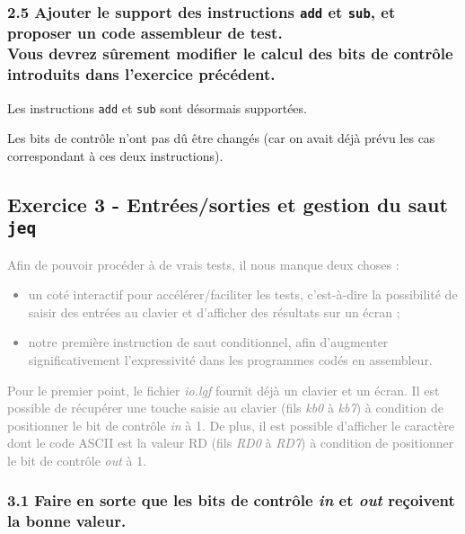 \documentclass[twoside, 12pt, a4paper]{article}
\begin{document}
        \subsubsection*{\textbf{2.5} Ajouter le support des instructions \texttt{add} et \texttt{sub}, et proposer un code assembleur de test. \\
        Vous devrez sûrement modifier le calcul des bits de contrôle introduits dans l'exercice précédent.}

Les instructions \texttt{add} et \texttt{sub} sont désormais supportées.


Les bits de contrôle n'ont pas dû être changés (car on avait déjà prévu les cas correspondant à ces deux instructions).
        
        \clearpage

        \subsection{Exercice 3 - Entrées/sorties et gestion du saut \texttt{jeq}}

\textcolor{gray}{
Afin de pouvoir procéder à de vrais tests, il nous manque deux choses :
\begin{itemize}
    \item un coté interactif pour accélérer/faciliter les tests, c’est-à-dire la possibilité de saisir des
entrées au clavier et d’afficher des résultats sur un écran ;
    \item notre première instruction de saut conditionnel, afin d’augmenter significativement l’expressivité dans les programmes codés en assembleur.
\end{itemize}
Pour le premier point, le fichier \textit{io.lgf} fournit déjà un clavier et un écran. Il est possible de
récupérer une touche saisie au clavier (fils \textit{kb0} à \textit{kb7}) à condition de positionner le bit de contrôle
\textit{in} à 1. De plus, il est possible d’afficher le caractère dont le code ASCII est la valeur RD (fils
\textit{RD0} à \textit{RD7}) à condition de positionner le bit de contrôle \textit{out} à 1.
}

        \subsubsection*{\textbf{3.1} Faire en sorte que les bits de contrôle \textit{in} et \textit{out} reçoivent la bonne valeur.}
\end{document}
